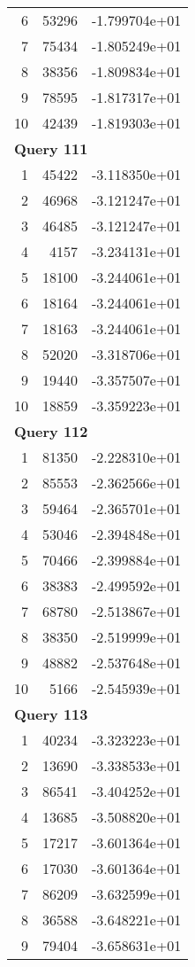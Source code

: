 \begin{longtable}[{p}]{@{}rrp{}@{}}
6 & 53296 & -1.799704e+01 \\
7 & 75434 & -1.805249e+01 \\
8 & 38356 & -1.809834e+01 \\
9 & 78595 & -1.817317e+01 \\
10 & 42439 & -1.819303e+01 \\
\midrule
\multicolumn{3}{l}{\bfseries Query 111} \\
1 & 45422 & -3.118350e+01 \\
2 & 46968 & -3.121247e+01 \\
3 & 46485 & -3.121247e+01 \\
4 & 4157 & -3.234131e+01 \\
5 & 18100 & -3.244061e+01 \\
6 & 18164 & -3.244061e+01 \\
7 & 18163 & -3.244061e+01 \\
8 & 52020 & -3.318706e+01 \\
9 & 19440 & -3.357507e+01 \\
10 & 18859 & -3.359223e+01 \\
\midrule
\multicolumn{3}{l}{\bfseries Query 112} \\
1 & 81350 & -2.228310e+01 \\
2 & 85553 & -2.362566e+01 \\
3 & 59464 & -2.365701e+01 \\
4 & 53046 & -2.394848e+01 \\
5 & 70466 & -2.399884e+01 \\
6 & 38383 & -2.499592e+01 \\
7 & 68780 & -2.513867e+01 \\
8 & 38350 & -2.519999e+01 \\
9 & 48882 & -2.537648e+01 \\
10 & 5166 & -2.545939e+01 \\
\midrule
\multicolumn{3}{l}{\bfseries Query 113} \\
1 & 40234 & -3.323223e+01 \\
2 & 13690 & -3.338533e+01 \\
3 & 86541 & -3.404252e+01 \\
4 & 13685 & -3.508820e+01 \\
5 & 17217 & -3.601364e+01 \\
6 & 17030 & -3.601364e+01 \\
7 & 86209 & -3.632599e+01 \\
8 & 36588 & -3.648221e+01 \\
9 & 79404 & -3.658631e+01 \\

\end{longtable}
